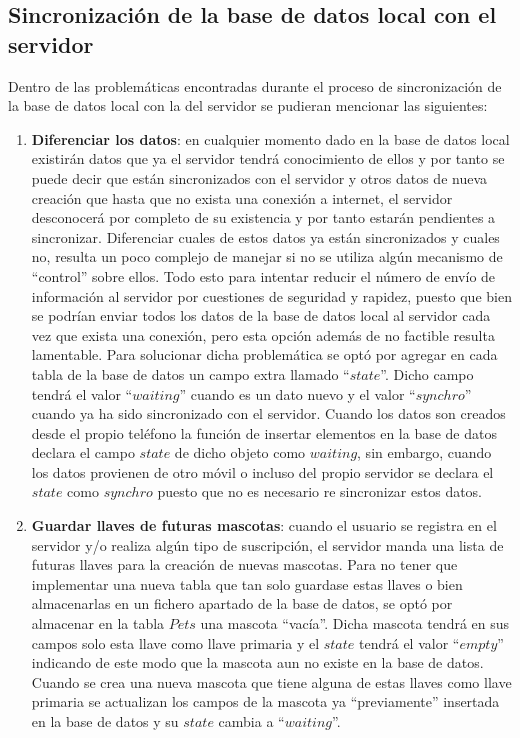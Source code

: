 \subsection{Sincronización de la base de datos local con el servidor}
Dentro de las problemáticas encontradas durante el proceso de sincronización de la base de datos local con la del servidor se pudieran mencionar las siguientes:
\begin{enumerate}

\item\textbf{Diferenciar los datos}: en cualquier momento dado en la base de datos local existirán datos que ya el servidor tendrá conocimiento de ellos y por tanto se puede decir que están sincronizados con el servidor y otros datos de nueva creación que hasta que no exista una conexión a internet, el servidor desconocerá por completo de su existencia y por tanto estarán pendientes a sincronizar. Diferenciar cuales de estos datos ya están sincronizados y cuales no, resulta un poco complejo de manejar si no se utiliza algún mecanismo de “control” sobre ellos. Todo esto para intentar reducir el número de envío de información al servidor por cuestiones de seguridad y rapidez, puesto que bien se podrían enviar todos los datos de la base de datos local al servidor cada vez que exista una conexión, pero esta opción además de no factible resulta lamentable. Para solucionar dicha problemática se optó por agregar en cada tabla de la base de datos un campo extra llamado “$state$”. Dicho campo tendrá el valor “$waiting$” cuando es un dato nuevo y el valor “$synchro$” cuando ya ha sido sincronizado con el servidor. Cuando los datos son creados desde el propio teléfono la función de insertar elementos en la base de datos declara el campo $state$ de dicho objeto como $waiting$, sin embargo, cuando los datos provienen de otro móvil o incluso del propio servidor se declara el $state$ como $synchro$ puesto que no es necesario re sincronizar  estos datos.
\item\textbf{Guardar llaves de futuras mascotas}: cuando el usuario se registra en el servidor y/o realiza algún tipo de suscripción, el servidor manda una lista de futuras llaves para la creación de nuevas mascotas. Para no tener que implementar una nueva tabla que tan solo guardase estas llaves o bien almacenarlas en un fichero apartado de la base de datos, se optó por almacenar en la tabla $Pets$ una mascota “vacía”. Dicha mascota tendrá en sus campos solo esta llave como llave primaria y el $state$ tendrá el valor “$empty$” indicando de este modo que la mascota aun no existe en la base de datos. Cuando se crea una nueva mascota que tiene alguna de estas llaves como llave primaria se actualizan los campos de la mascota ya “previamente” insertada en la base de datos y su $state$ cambia a “$waiting$”.

\end{enumerate}
